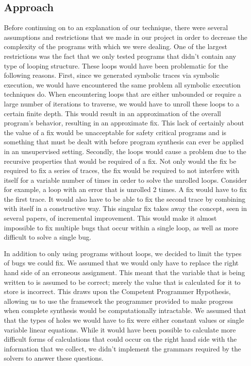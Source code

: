 \documentclass[]{article}
\begin{document}
\subsection{Approach}
Before continuing on to an explanation of our technique, there were several assumptions and restrictions that we made in our project in order to decrease the complexity of the programs with which we were dealing.  One of the largest restrictions was the fact that we only tested programs that didn't contain any type of looping structure.  These loops would have been problematic for the following reasons.  First, since we generated symbolic traces via symbolic execution, we would have encountered the same problem all symbolic execution techniques do.  When encountering loops that are either unbounded or require a large number of iterations to traverse, we would have to unroll these loops to a certain finite depth.  This would result in an approximation of the overall program's behavior, resulting in an approximate fix.  This lack of certainly about the value of a fix would be unacceptable for safety critical programs and is something that must be dealt with before program synthesis can ever be applied in an unsupervised setting.  Secondly, the loops would cause a problem due to the recursive properties that would be required of a fix.  Not only would the fix be required to fix a series of traces, the fix would be required to not interfere with itself for a variable number of times in order to solve the unrolled loops.  Consider for example, a loop with an error that is unrolled 2 times.  A fix would have to fix the first trace.  It would also have to be able to fix the second trace by combining with itself in a constructive way.  This singular fix takes away the concept, seen in several papers, of incremental improvement.  This would make it almost impossible to fix multiple bugs that occur within a single loop, as well as more difficult to solve a single bug.

In addition to only using programs without loops, we decided to limit the types of bugs we could fix.  We assumed that we would only have to replace the right hand side of an erroneous assignment.  This meant that the variable that is being written to is assumed to be correct; merely the value that is calculated for it to store is incorrect.  This draws upon the Competent Programmer Hypothesis, allowing us to use the framework the programmer provided to make progress when complete synthesis would be computationally intractable.  We assumed that that the types of holes we would have to fix were either constant values or single variable linear equations.  While it would have been possible to calculate more difficult forms of calculations that could occur on the right hand side with the information that we collect, we didn't implement the grammars required by the solvers to answer these questions.
\end{document}
